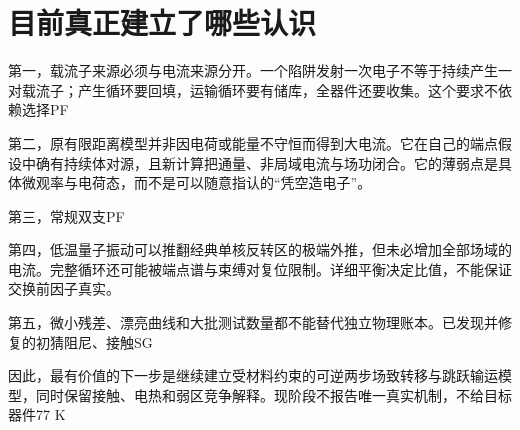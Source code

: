 \documentclass[11pt,a4paper]{article}
\begin{document}
\section{{\cjkfont 目前真正建立了哪些认识}\allowbreak{}}\label{sec:58}
{\cjkfont 第一，载流子来源必须与电流来源分开。一个陷阱发射一次电子不等于持续产生一对载流子；产生循环要回填，运输循环要有储库，全器件还要收集。这个要求不依赖选择}\allowbreak{}PF\allowbreak{}
\par
{\cjkfont 第二，原有限距离模型并非因电荷或能量不守恒而得到大电流。它在自己的端点假设中确有持续体对源，且新计算把通量、非局域电流与场功闭合。它的薄弱点是具体微观率与电荷态，而不是可以随意指认的“凭空造电子”。}\allowbreak{}
\par
{\cjkfont 第三，常规双支}\allowbreak{}PF\allowbreak{}
\par
{\cjkfont 第四，低温量子振动可以推翻经典单核反转区的极端外推，但未必增加全部场域的电流。完整循环还可能被端点谱与束缚对复位限制。详细平衡决定比值，不能保证交换前因子真实。}\allowbreak{}
\par
{\cjkfont 第五，微小残差、漂亮曲线和大批测试数量都不能替代独立物理账本。已发现并修复的初猜阻尼、接触}\allowbreak{}SG\allowbreak{}
\par
{\cjkfont 因此，最有价值的下一步是继续建立受材料约束的可逆两步场致转移与跳跃输运模型，同时保留接触、电热和弱区竞争解释。现阶段不报告唯一真实机制，不给目标器件}\allowbreak{}77 K\allowbreak{}
\par
{}
\medskip
\clearpage
\end{document}
